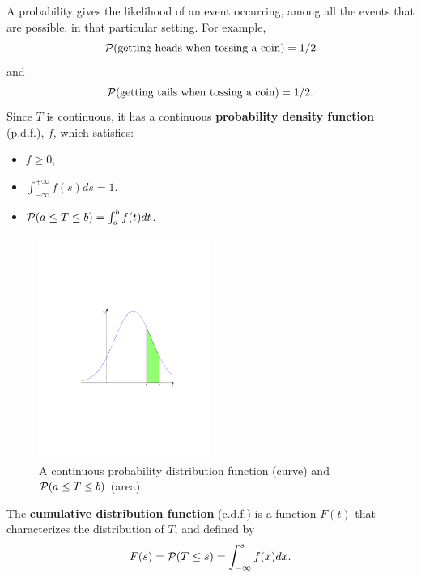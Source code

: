 A probability gives the likelihood of an event occurring, among all the events that are
possible, in that particular setting. For example, 
\[
\mathcal{P}(\textrm{getting heads
when tossing a coin})=1/2
\]
and 
\[
\mathcal{P}(\textrm{getting tails when tossing a
coin})=1/2.
\]
Since $T$ is continuous, it has a continuous \textbf{probability density function} (p.d.f.), $f$, which satisfies:
\begin{itemize}
\item $f\geq 0$,
\item $\int_{-\infty}^{+\infty}f(s)ds=1$.
\item $\mathcal{P}(a\leq T\leq b)=\int_a^bf(t)dt$.
\end{itemize}
\begin{figure}[htbp]
\begin{center}
\includegraphics[width=0.5\textwidth]{../figs_03_residence_time/distrib_a_b}
\caption{A continuous probability distribution function (curve) and $\mathcal{P}(a\leq T\leq b)$ (area).}
\end{center}
\end{figure}
The \textbf{cumulative distribution function} (c.d.f.) is a function $F(t)$ that characterizes the distribution of $T$, and defined by
\[
F(s)=\mathcal{P}(T\leq s)=\int_{-\infty}^sf(x)dx.
\]
